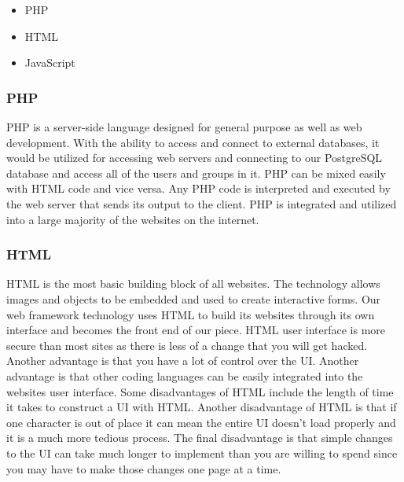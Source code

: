 \documentclass[draftclsnofoot,10pt,onecolumn]{IEEEtran} %
\begin{document}
	\begin{itemize}
		\item PHP
		\item HTML
		\item JavaScript \\
	\end{itemize}
	
\subsubsection{PHP}
PHP is a server-side language designed for general purpose as well as web development. With the ability to access and
connect to external databases, it would be utilized for accessing web servers and connecting to our PostgreSQL database and
access all of the users and groups in it. PHP can be mixed easily with HTML code and vice versa. Any PHP code is
interpreted and executed by the web server that sends its output to the client. PHP is integrated and utilized into a large
majority of the websites on the internet. \\

\subsubsection{HTML}
HTML is the most basic building block of all websites. The technology allows images and objects to be embedded and used
to create interactive forms. Our web framework technology uses HTML to build its websites through its own interface and
becomes the front end of our piece. HTML user interface is more secure than most sites as there is less of a change that you
will get hacked. Another advantage is that you have a lot of control over the UI. Another advantage is that other coding
languages can be easily integrated into the websites user interface. Some disadvantages of HTML include the length of time
it takes to construct a UI with HTML. Another disadvantage of HTML is that if one character is out of place it can mean the
entire UI doesn't load properly and it is a much more tedious process. The final disadvantage is that simple changes to the UI
can take much longer to implement than you are willing to spend since you may have to make those changes one page at a
time. \\
\end{document}
